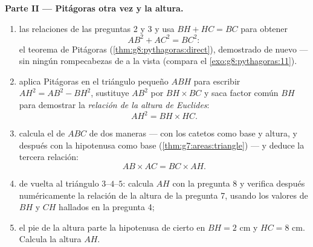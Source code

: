\begin{problem}
\medskip
\noindent\textbf{Parte II --- Pitágoras otra vez y la altura.}
\begin{enumerate}[resume]
  \item {} las relaciones de las preguntas 2 y 3 y usa
        $BH + HC = BC$ para obtener
        \[
        AB^2 + AC^2 = BC^2 :
        \]
        el teorema de Pitágoras (\cref{thm:g8:pythagoras:direct}),
        demostrado de nuevo --- sin ningún rompecabezas de  a la vista (compara el
        \cref{exo:g8:pythagoras:11}).
  \item aplica Pitágoras en el triángulo pequeño $ABH$ para escribir
        $AH^2 = AB^2 - BH^2$, sustituye $AB^2$ por
        $BH \times BC$ y saca factor común $BH$ para demostrar
        la \emph{relación de la altura de Euclides}:
        \[
        AH^2 = BH \times HC .
        \]
  \item calcula el  de $ABC$ de dos maneras --- con los catetos como base
        y altura, y después con la hipotenusa como base
        (\cref{thm:g7:areas:triangle}) --- y deduce la tercera
        relación:
        \[
        AB \times AC = BC \times AH .
        \]
  \item de vuelta al triángulo $3$--$4$--$5$: calcula $AH$ con la
        pregunta 8 y verifica después numéricamente la relación de la altura de la pregunta
        7, usando los valores de $BH$ y $CH$ hallados en la
        pregunta 4;
  \item el pie de la altura parte la hipotenusa de cierto  en  $BH = 2$ cm y $HC = 8$ cm.
        Calcula la altura $AH$.
\end{enumerate}


\end{problem}
